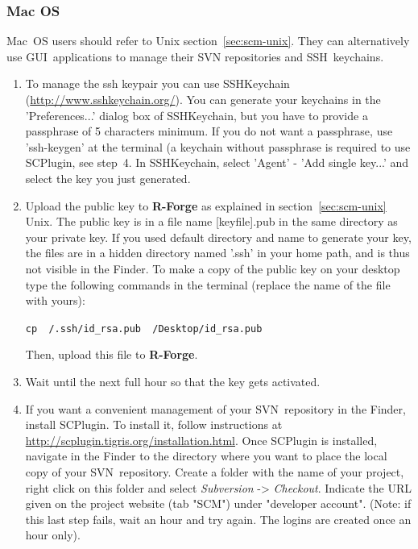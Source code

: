 \documentclass[a4paper]{article}
\let\code=\texttt
\begin{document}
\subsubsection{Mac OS}
\label{sec:scm-macosx}
Mac~OS users should refer to Unix section~\ref{sec:scm-unix}. They
can alternatively use GUI~applications to manage their SVN
repositories and SSH~keychains.

\begin{enumerate}
\item To manage the ssh keypair you can use SSHKeychain
(\url{http://www.sshkeychain.org/}). You can generate your keychains
in the 'Preferences...' dialog box of SSHKeychain, but you have to provide a
passphrase of 5 characters minimum. If you do not want a passphrase,
use 'ssh-keygen' at the terminal (a keychain without passphrase is
required to use SCPlugin, see step~4. In SSHKeychain, select 'Agent'
- 'Add single key...' and select the key you just generated. 

\item Upload the public key to \textbf{R-Forge} as explained in
  section~\ref{sec:scm-unix}
  Unix. The public key is in a file name [keyfile].pub in the same
  directory as your private key. If you used default directory and
  name to generate your key, the files are in a hidden directory named
  '.ssh' in your home path, and is thus not visible in the Finder. To
  make a copy of the public key on your desktop type the following
  commands in the terminal (replace the name of the file with yours): 

  \code{cp ~/.ssh/id\_rsa.pub ~/Desktop/id\_rsa.pub}
  
  Then, upload this file to \textbf{R-Forge}.

\item Wait until the next full hour so that the key gets activated.

\item If you want a convenient management of your SVN~repository in the
  Finder, install SCPlugin. To install it, follow instructions at
  \url{http://scplugin.tigris.org/installation.html}. Once SCPlugin is
  installed, navigate in the Finder to the directory where you want to
  place the local copy of your SVN~repository. Create a folder with the name
  of your project, right click on this folder and select \textit{Subversion}
  -> \textit{Checkout}. Indicate the URL given on the project website (tab
  "SCM") under "developer account". (Note: if this last step fails,
  wait an hour and try again. The logins are created once an hour
  only). 

\end{enumerate}
\end{document}
